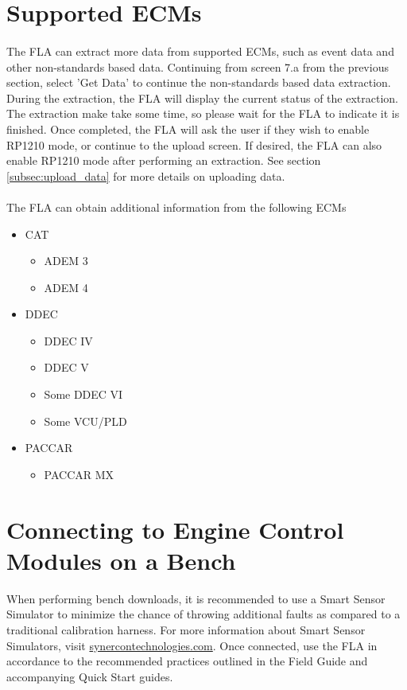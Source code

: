 \documentclass[11pt, oneside]{book}
\begin{document}
\section{Supported ECMs}
\paragraph{  }
The FLA can extract more data from supported ECMs, such as event data and other non-standards based data. Continuing from screen 7.a from the previous section, select 'Get Data' to continue the non-standards based data extraction. During the extraction, the FLA will display the current status of the extraction. The extraction make take some time, so please wait for the FLA to indicate it is finished. Once completed, the FLA will ask the user if they wish to enable RP1210 mode, or continue to the upload screen. If desired, the FLA can also enable RP1210 mode after performing an extraction. See section \ref{subsec:upload_data} for more details on uploading data.
\paragraph{  }
The FLA can obtain additional information from the following ECMs
\begin{itemize}
\item CAT
\begin{itemize}
\item ADEM 3
\item ADEM 4
\end{itemize}
\item DDEC
\begin{itemize}
\item DDEC IV
\item DDEC V
\item Some DDEC VI
\item Some VCU/PLD
\end{itemize}
\item PACCAR
  \begin{itemize}
  \item{PACCAR MX}
  \end{itemize}
\end{itemize}

\section{Connecting to Engine Control Modules on a Bench}

When performing bench downloads, it is recommended to use a Smart
Sensor Simulator to minimize the chance of throwing additional faults
as compared to a traditional calibration harness. For more information
about Smart Sensor Simulators, visit \url{synercontechnologies.com}.
Once connected, use the FLA in accordance to the recommended practices
outlined in the Field Guide and accompanying Quick Start guides.
\end{document}
